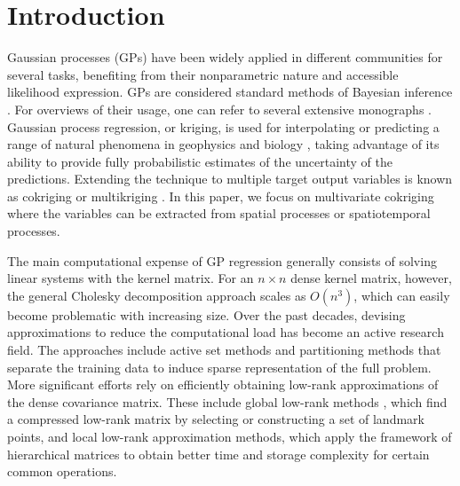 \documentclass[article,ij4uq]{ij4uq}              %
\begin{document}


\maketitle

\section{Introduction}\label{sec1}
\par Gaussian processes (GPs) have been widely applied in different communities for several tasks, benefiting from their nonparametric nature and accessible likelihood expression. GPs are considered standard methods of Bayesian inference \cite{GPforML}. For overviews of their usage, one can refer to several extensive monographs \cite{GPforML,MackayIntro,WilliamsPrediction}. Gaussian process regression, or kriging, is used for interpolating or predicting a range of natural phenomena in geophysics and biology \cite{SteinKriging,WilliamsPrediction,KocijanGaussian}, taking advantage of its ability to provide fully probabilistic estimates of the uncertainty of the predictions. Extending the technique to multiple target output variables is known as cokriging \cite{SteinKriging,ChilesGeostatistics} or multikriging \cite{BoyleDependent}. In this paper, we focus on multivariate cokriging where the variables can be extracted from spatial processes or spatiotemporal processes. 
\par The main computational expense of GP regression generally consists of solving linear systems with  the kernel matrix. For an $n\times n$ dense kernel matrix, however, the general Cholesky decomposition approach scales as $O(n^{3})$, which can easily become problematic with increasing size. Over the past decades, devising approximations to reduce the computational load has become an active research field. The approaches include active set methods \cite{QuinoneroUnifying} and partitioning methods \cite{TrespBayesian,NguyenLocal} that separate the training data to induce sparse representation of the full problem. More significant efforts rely on efficiently obtaining low-rank approximations of the dense covariance matrix. These include global low-rank methods \cite{SiMemory,XuLow}, which find a compressed low-rank matrix by selecting or constructing a set of landmark points, and local low-rank approximation methods, which apply the framework of hierarchical matrices  \cite{AmbikasaranFast,BormApproximating} to obtain better time and storage complexity for certain common operations.
\end{document}
